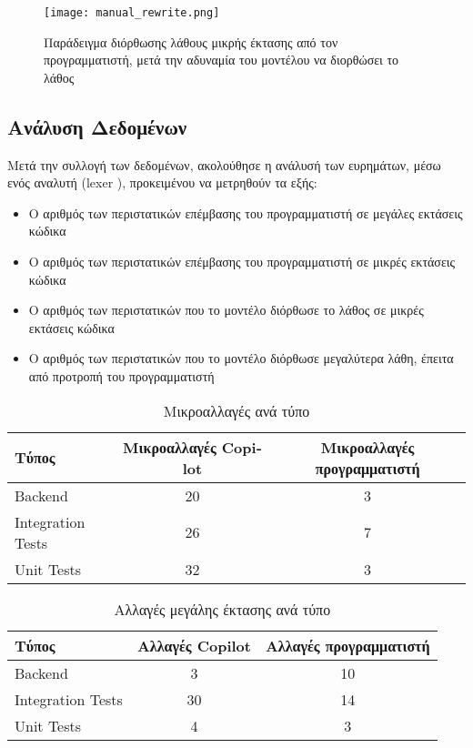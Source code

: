 \begin{figure}[H]
  \begin{center}
    \texttt{[image: manual\_rewrite.png]}
    \caption{Παράδειγμα διόρθωσης λάθους μικρής έκτασης από τον
      προγραμματιστή, μετά την αδυναμία του μοντέλου να διορθώσει το
      λάθος}
  \end{center}
  \label{fig:manualRewrite}
\end{figure}

\subsection{Ανάλυση Δεδομένων}

Μετά την συλλογή των δεδομένων, ακολούθησε η ανάλυσή των ευρημάτων, μέσω
ενός αναλυτή (\textlatin{lexer} \cite{ball2018}), προκειμένου να
μετρηθούν τα εξής:

\begin{itemize}
\item
  O αριθμός των περιστατικών επέμβασης του προγραμματιστή σε μεγάλες
  εκτάσεις κώδικα
\item
  Ο αριθμός των περιστατικών επέμβασης του προγραμματιστή σε μικρές
  εκτάσεις κώδικα
\item
  Ο αριθμός των περιστατικών που το μοντέλο διόρθωσε το λάθος σε μικρές
  εκτάσεις κώδικα
\item
  Ο αριθμός των περιστατικών που το μοντέλο διόρθωσε μεγαλύτερα λάθη,
  έπειτα από προτροπή του προγραμματιστή
\end{itemize}

\begin{table}[h]
  \centering
  \begin{tabular}{lcc}
    \hline
    \textbf{Τύπος} & \textbf{Μικροαλλαγές \textlatin{Copilot}} & \textbf{Μικροαλλαγές προγραμματιστή} \\ \hline
    \textlatin{Backend} & 20 & 3 \\
    \textlatin{Integration Tests} & 26 & 7 \\
    \textlatin{Unit Tests} & 32 & 3 \\ \hline
  \end{tabular}
  \caption{Μικροαλλαγές ανά τύπο}
  \label{table:microchanges_by_subject}
\end{table}

\begin{table}[h]
  \centering
  \begin{tabular}{lcc}
    \hline
    \textbf{Τύπος} & \textbf{Αλλαγές \textlatin{Copilot}} & \textbf{Αλλαγές προγραμματιστή} \\ \hline
    \textlatin{Backend} & 3 & 10 \\
    \textlatin{Integration Tests} & 30 & 14 \\
    \textlatin{Unit Tests} & 4 & 3 \\ \hline
  \end{tabular}
  \caption{Αλλαγές μεγάλης έκτασης ανά τύπο}
  \label{table:major_changes_by_subject}
\end{table}

